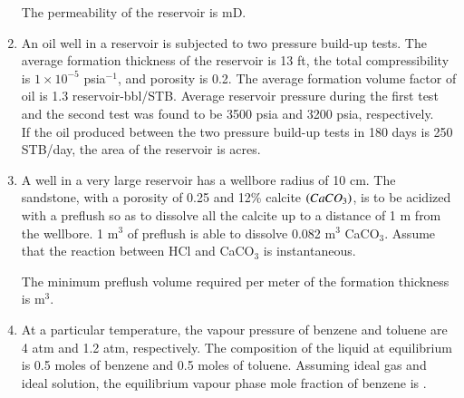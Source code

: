 \documentclass[journal,12pt,onecolumn]{IEEEtran}
\theoremstyle{remark}
\begin{document}
\begin{enumerate}
The permeability of the reservoir is \underline{\hspace{2cm}} mD.  

\hfill{}

\item An oil well  in a reservoir is subjected to two pressure build-up tests. The average formation thickness of the reservoir is 13 ft, the total compressibility is $1\times10^{-5}$ psia$^{-1}$, and porosity is 0.2. The average formation volume factor of oil is 1.3 reservoir-bbl/STB. Average reservoir pressure during the first test and the second test was found to be 3500 psia and 3200 psia, respectively. \\ 
If the oil produced between the two pressure build-up tests in 180 days is 250 STB/day, the area of the reservoir is \underline{\hspace{2cm}} acres.  \\ 

\hfill{}

\item A well in a very large reservoir has a wellbore radius of 10 cm. The sandstone, with a porosity of 0.25 and 12\%  calcite $\left(CaCO_3\right)$, is to be acidized with a preflush  so as to dissolve all the calcite up to a distance of 1 m from the wellbore. 1 m$^3$ of preflush is able to dissolve 0.082 m$^3$ CaCO$_3$. Assume that the reaction between HCl and CaCO$_3$ is instantaneous. 

The minimum preflush volume required per meter of the formation thickness is \underline{\hspace{2cm}} m$^3$.  

\hfill{}

\item At a particular temperature, the vapour pressure of benzene and toluene are 4 atm and 1.2 atm, respectively. The composition of the liquid at equilibrium is 0.5 moles of benzene and 0.5 moles of toluene. Assuming ideal gas and ideal solution, the equilibrium vapour phase mole fraction of benzene is \underline{\hspace{2cm}}.  


\end{enumerate}
\end{document}
